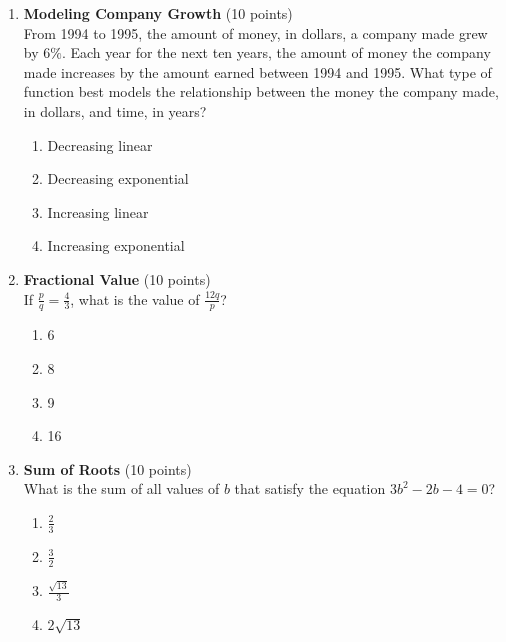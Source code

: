 \begin{enumerate}
  \newpage

  \item \textbf{Modeling Company Growth} (10 points)\\
  From 1994 to 1995, the amount of money, in dollars, a company made grew by $6\%$. Each year for the next ten years, the amount of money the company made increases by the amount earned between 1994 and 1995. What type of function best models the relationship between the money the company made, in dollars, and time, in years?
  \begin{enumerate}[label=(\Alph*)]
    \item Decreasing linear
    \item Decreasing exponential
    \item Increasing linear
    \item Increasing exponential
  \end{enumerate}
  \begin{subanswer}
  \end{subanswer}

  \item \textbf{Fractional Value} (10 points)\\
  If $\frac{p}{q}=\frac{4}{3}$, what is the value of $\frac{12q}{p}$?
  \begin{enumerate}[label=(\Alph*)]
    \item 6
    \item 8
    \item 9
    \item 16
  \end{enumerate}
  \begin{subanswer}
  \end{subanswer}

  \item \textbf{Sum of Roots} (10 points)\\
  What is the sum of all values of $b$ that satisfy the equation $3b^2-2b-4=0$?
  \begin{enumerate}[label=(\Alph*)]
    \item $\frac{2}{3}$
    \item $\frac{3}{2}$
    \item $\frac{\sqrt{13}}{3}$
    \item $2\sqrt{13}$
  \end{enumerate}
  \begin{subanswer}
  \end{subanswer}


\end{enumerate}
